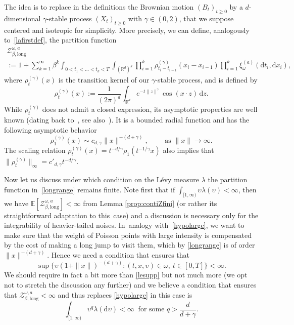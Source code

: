 \documentclass[10pt]{amsart}
\let\mathcal\mathscr
\let\sep:
\theoremstyle{definition}
\newcommand{\dd}{\mathrm{d}}
\newcommand{\R}{\mathbb{R}}
\newcommand{\cZ}{{\ensuremath{\mathcal Z}} }
\newcommand{\bbE}{{\ensuremath{\mathbb E}} }
\newcommand{\bbR}{{\ensuremath{\mathbb R}} }
\let\gb\beta
\let\gl\lambda
\let\ups\upsilon
\let\go\omega
\begin{document}
The idea is to replace in the definitions the
Brownian motion $(B_t)_{t\geq 0}$
by a $d$\nobreakdash-dimen\-sional $\gamma$-stable process $(X_t)_{t\geq 0}$ with $\gamma\in (0,2)$, that we suppose centered and isotropic for simplicity. More precisely, we can define, analogously to~\eqref{lafirstdef}, the partition function\vspace*{-5pt}
\begin{multline}
\label{longrange}
\cZ_{\gb,\mathrm{long}}^{\go,a}\\[-5pt]
:= 1+\sum_{k=1}^\infty \beta^k\int_{0<t_1<\dots<t_k<T}\int_{(\bbR^d)^k} \prod_{i=1}^k \rho^{(\gamma)}_{t_i-t_{i-1}} (x_i-x_{i-1}) \prod_{i=1}^k \xi_{\go}^{(a)} (\dd t_i, \dd x_i),
\end{multline}
where $\rho_{t}^{(\gamma)}(x)$ is the transition kernel
of our $\gamma$-stable process, and is defined by
\[
\rho_t^{(\gamma)}(x) := \frac{1}{(2\pi)^d} \int_{\R^d} e^{-t \|z\|^{\gamma}} \cos(x \cdot z) \,\dd z.
\]
While $\rho_t^{(\gamma)}$ does not admit a closed expression, its asymptotic properties are well known (dating back to~\cite{K70}, see also~\cite[Ch.\,2]{ST94}).
It is a bounded radial function and has
the following asymptotic behavior
\begin{equation}\label{thetail}
\rho_1^{(\gamma)} (x) \sim c_{d,\gamma} \|x\|^{-(d+\gamma)},
\qquad \text{ as }
\| x\|\to \infty.
\end{equation}
The scaling relation
$\rho_{t}^{(\gamma)}(x) = t^{-d/\gamma} \rho_1(t^{-1/\gamma} x)$
also implies that $\|\rho_{t}^{(\gamma)} \|_{\infty}= c'_{d,\gamma} t^{-d/\gamma}.$

Now let us discuss under which condition on the Lévy measure $\gl$ the partition function in~\eqref{longrange} remains finite. Note first that if $\int_{[1,\infty)} \ups \gl(\ups)<\infty$, then we have $\bbE [ \cZ_{\gb,\mathrm{long}}^{\go,a} ]<\infty$ from Lemma \ref{prop:contiZfini} (or rather its straightforward adaptation to this~case) and a discussion is necessary only for the integrability of heavier-tailed noises.
In~analogy with~\eqref{hypolarge}, we want to make sure that
the weight of Poisson points with large intensity is compensated by the cost of making a long jump to visit them, which by \eqref{longrange} is of order
$\|x\|^{-(d+\gamma)}$. Hence we need a condition that ensures that
\begin{equation}\label{lesupp}
\sup \bigl\{ \ups (1+ \|x\|)^{-(d+\gamma)} \sep (t,x,\ups) \in \go, \ t\in[0,T] \bigr\} <\infty.
\end{equation}
We should require in fact a bit more than \eqref{lesupp} but not much more (we opt not to stretch the discussion any further) and we believe
a condition that ensures that $\cZ_{\gb,\mathrm{long}}^{\go,a}<\infty$ and thus replaces \eqref{hypolarge} in this case is
\begin{equation}
\label{hypolargelongrange}
\int_{[1,\infty)} \ups^{q} \lambda(\dd \ups) <\infty
\ \text{ for some } q> \frac{d}{d+\gamma}.
\end{equation}
\end{document}
